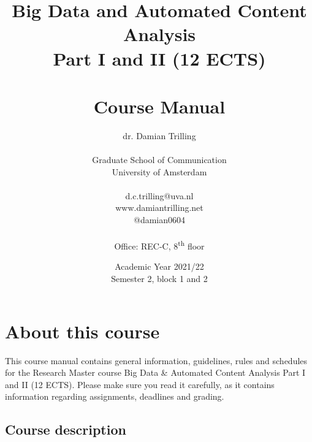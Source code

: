 \documentclass[a4paper,10pt,twocolumn]{report}
\title{Big Data and Automated Content Analysis\\ Part I and II (12 ECTS)\\~\\Course Manual}
\author{dr. Damian Trilling\\~\\Graduate School of Communication\\University of Amsterdam\\~\\d.c.trilling@uva.nl \\www.damiantrilling.net \\@damian0604 \\~\\Office: REC-C, 8\textsuperscript{th} floor}
\date{Academic Year 2021/22\\Semester 2, block 1 and 2}
\begin{document}
\maketitle



\chapter{About this course}

This course manual contains general information, guidelines, rules and schedules for the Research Master course Big Data \& Automated Content Analysis Part I and II (12 ECTS). Please make sure you read it carefully, as it  contains information regarding assignments, deadlines and grading.

\section{Course description}


\end{document}
